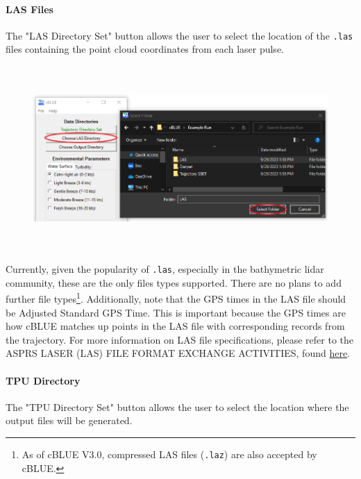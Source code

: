 \documentclass[11pt, a4paper]{article}
\begin{document}
\paragraph{LAS Files}
\hfill \break \newline
The "LAS Directory Set" button allows the user to select the location of the \texttt{.las} files containing the point cloud coordinates from each laser pulse. 

\begin{figure}[H]
    \centering
    \includegraphics[height=7cm]{figs/select_las_gui.png}
\end{figure}

Currently, given the popularity of \texttt{.las}, especially in the bathymetric lidar community, these are the only files types supported. There are no plans to add further file types\footnote{As of cBLUE V3.0, compressed LAS files (\texttt{.laz}) are also accepted by cBLUE.}. Additionally, note that the GPS times in the LAS file should be Adjusted Standard GPS Time. This is important because the GPS times are how cBLUE matches up points in the LAS file with corresponding records from the trajectory. For more information on LAS file specifications, please refer to the ASPRS LASER (LAS) FILE FORMAT EXCHANGE ACTIVITIES, found \href{https://www.asprs.org/divisions-committees/lidar-division/laser-las-file-format-exchange-activities}{here}.

\paragraph{TPU Directory}
\hfill \break \newline
The "TPU Directory Set" button allows the user to select the location where the output files will be generated. 
\end{document}
